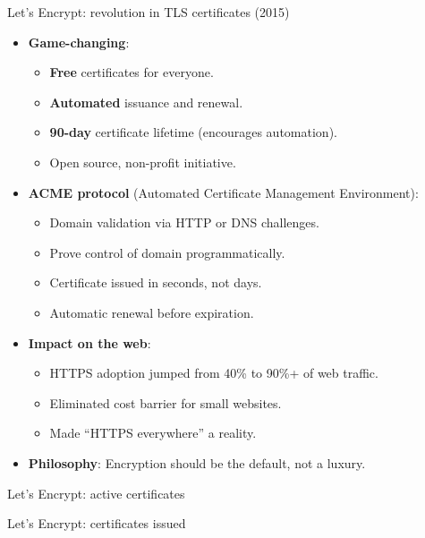 \documentclass[aspectratio=169, lualatex, handout]{beamer}
\begin{document}
\begin{frame}{Let's Encrypt: revolution in TLS certificates (2015)}
	\begin{itemize}
		\item \textbf{Game-changing}:
		      \begin{itemize}
			      \item \textbf{Free} certificates for everyone.
			      \item \textbf{Automated} issuance and renewal.
			      \item \textbf{90-day} certificate lifetime (encourages automation).
			      \item Open source, non-profit initiative.
		      \end{itemize}
		\item \textbf{ACME protocol} (Automated Certificate Management Environment):
		      \begin{itemize}
			      \item Domain validation via HTTP or DNS challenges.
			      \item Prove control of domain programmatically.
			      \item Certificate issued in seconds, not days.
			      \item Automatic renewal before expiration.
		      \end{itemize}
		\item \textbf{Impact on the web}:
		      \begin{itemize}
			      \item HTTPS adoption jumped from 40\% to 90\%+ of web traffic.
			      \item Eliminated cost barrier for small websites.
			      \item Made ``HTTPS everywhere'' a reality.
		      \end{itemize}
		\item \textbf{Philosophy}: Encryption should be the default, not a luxury.
	\end{itemize}
\end{frame}

\begin{frame}{Let's Encrypt: active certificates}
\end{frame}

\begin{frame}{Let's Encrypt: certificates issued}
\end{frame}
\end{document}
